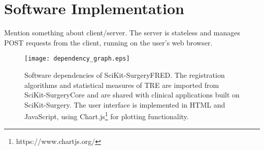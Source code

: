 \section{Software Implementation}

Mention something about client/server. The server is stateless and manages POST requests from the client, running on the user's web browser.

\begin{figure}
	\begin{center}
	\texttt{[image: dependency\_graph.eps]}
		\caption{\label{fig:dependencies}Software dependencies of SciKit-SurgeryFRED. The registration algorithms and statistical measures of {TRE} are imported from SciKit-SurgeryCore and are shared with clinical applications built on SciKit-Surgery. The user interface is implemented in HTML and JavaScript, using Chart.js\footnote{https://www.chartjs.org/} for plotting functionality.}
	\end{center}
\end{figure}

